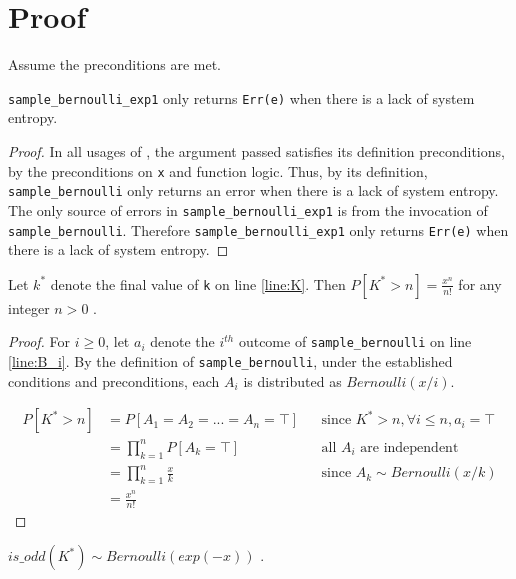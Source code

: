 \documentclass{article}
\begin{document}
\section{Proof}
Assume the preconditions are met.

\begin{lemma}
    \label{err-e}
    \texttt{sample\_bernoulli\_exp1} only returns \texttt{Err(e)} when there is a lack of system entropy.
\end{lemma}

\begin{proof}
    In all usages of , the argument passed satisfies its definition preconditions, 
    by the preconditions on \texttt{x} and function logic.
    Thus, by its definition, \texttt{sample\_bernoulli} only returns an error when there is a lack of system entropy.
    The only source of errors in \texttt{sample\_bernoulli\_exp1} is from the invocation of \texttt{sample\_bernoulli}.
    Therefore \texttt{sample\_bernoulli\_exp1} only returns \texttt{Err(e)} when there is a lack of system entropy.
\end{proof}

\begin{lemma}
    \label{P_K_gt_n}
    Let $k^{*}$ denote the final value of \texttt{k} on line \ref{line:K}.
    Then $P[K^{*} > n] = \frac{x^n}{n!}$ for any integer $n > 0$ \cite{CKS20}.
\end{lemma}

\begin{proof}
    For $i \ge 0$, let $a_i$ denote the $i^{th}$ outcome of \texttt{sample\_bernoulli} on line \ref{line:B_i}.
    By the definition of \texttt{sample\_bernoulli}, under the established conditions and preconditions,
    each $A_i$ is distributed as $Bernoulli(x / i)$.

    \begin{align*}
        P[K^{*} > n] &= P[A_1 = A_2 = ... = A_n = \top] && \text{since } K^{*} > n, \forall i \leq n, a_i = \top \\
        &= \prod_{k=1}^n P[A_k = \top] && \text{all $A_i$ are independent} \\
        &= \prod_{k=1}^n \frac{x}{k} && \text{since $A_k \sim Bernoulli(x/k)$} \\
        &= \frac{x^n}{n!}
    \end{align*}
\end{proof}

\begin{lemma}
    \label{ok-out}
    $is\_odd(K^{*}) \sim Bernoulli(exp(-x))$ \cite{CKS20}.
\end{lemma}
\end{document}
